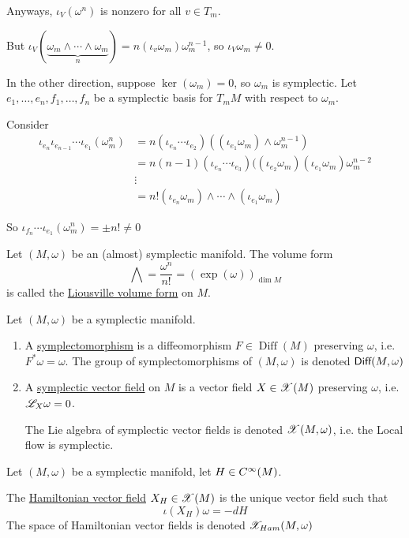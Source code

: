 \documentclass[x11names,reqno,14pt]{extarticle}
\begin{document}
Anyways, $\iota_V(\omega^n)$ is nonzero for all $v \in T_m$. 

But $\iota_V(\underbrace{\omega_m\wedge\cdots\wedge\omega_m}_{n}) = n(\iota_v\omega_m)\omega_m^{n-1}$, so $\iota_V\omega_m\neq0$. 

In the other direction, suppose $\ker(\omega_m) = 0$, so $\omega_m$ is symplectic. Let $e_1, \dots, e_n, f_1, \dots, f_n$ be a symplectic basis for $T_mM$ with respect to $\omega_m$.

Consider 
\begin{align*}
\iota_{e_n}\iota_{e_{n-1}}\cdots\iota_{e_1}(\omega_m^n) & = n(\iota_{e_n}\cdots\iota_{e_2})((\iota_{e_1}\omega_m)\wedge \omega_m^{n-1}) \\
& = n(n-1)(\iota_{e_n}\cdots\iota_{e_3})((\iota_{e_2}\omega_m)(\iota_{e_1}\omega_m)\omega_m^{n-2} \\
& \vdots \\
& = n!(\iota_{e_n}\omega_m)\wedge\cdots\wedge(\iota_{e_1}\omega_m)
\end{align*}

So $\iota_{f_n}\cdots\iota_{e_1}(\omega_m^n) = \pm n! \neq 0$


Let $(M,\omega)$ be an (almost) symplectic manifold. The volume form 
\[
\bigwedge = \frac{\omega^n}{n!} = (\exp(\omega))_{\dim M}
\]
is called the \underline{Liousville volume form} on $M$. 


Let $(M,\omega)$ be a symplectic manifold.
\begin{enumerate}[label=(\alph*)]

\item A \underline{symplectomorphism} is a diffeomorphism $F \in \operatorname{Diff}(M)$ preserving $\omega$, i.e. $F^*\omega = \omega$. The group of symplectomorphisms of $(M,\omega)$ is denoted ${{\text{\sffamily {Diff}}}}(M,\omega)$

\item A \underline{symplectic vector field} on $M$ is a vector field $X \in \mathscr{X}(M)$ preserving $\omega$, i.e. $\mathscr{L}_X\omega = 0$.

The Lie algebra of symplectic vector fields is denoted $\mathscr{X}(M,\omega)$, i.e. the Local flow is symplectic. 

\end{enumerate}


Let $(M,\omega)$ be a symplectic manifold, let $H\in C^\infty(M)$. 

The \underline{Hamiltonian vector field} $X_H \in \mathscr{X}(M)$ is the unique vector field such that 
\[
\iota(X_H)\omega = -dH
\]
The space of Hamiltonian vector fields is denoted $\mathscr{X}_{Ham}(M,\omega)$
\end{document}
